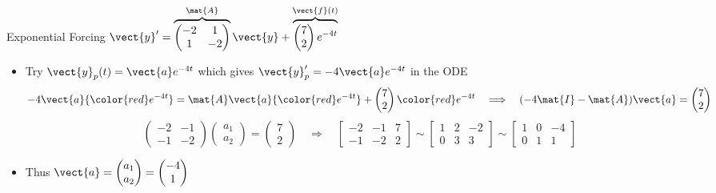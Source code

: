 \begin{frame}{Exponential Forcing \qquad $\vect{y}'=\overbrace{\begin{pmatrix}-2&1\\1&-2\end{pmatrix}}^{\mat{A}}\vect{y}+\overbrace{\begin{pmatrix}7\\2\end{pmatrix}e^{-4t}}^{\vect{f}(t)}$}
\small
\setlength{\abovedisplayskip}{3pt}
\setlength{\belowdisplayskip}{3pt}
\begin{itemize}
\setlength{\itemsep}{3pt}
  \item Try $\vect{y}_p(t)=\vect{a}e^{-4t}$ which gives
  $\vect{y}_p'=-4\vect{a}e^{-4t}$ in the ODE
  \[
    -4\vect{a}{\color{red}e^{-4t}}=\mat{A}\vect{a}{\color{red}e^{-4t}}
    +\begin{pmatrix}7\\2\end{pmatrix}{\color{red}e^{-4t}}
    \quad\Longrightarrow\quad
    (-4\mat{I}-\mat{A})\vect{a}=\begin{pmatrix}7\\2\end{pmatrix}
  \]
  \[
    \left(\begin{array}{rr}-2&-1\\-1&-2\end{array}\right)\begin{pmatrix}a_1\\a_2\end{pmatrix}
    =\begin{pmatrix}7\\2\end{pmatrix}
    \quad\Longrightarrow\quad
    \left[\begin{array}{rr|r}-2&-1&7\\-1&-2&2\end{array}\right]
    \sim\left[\begin{array}{rr|r}1&2&-2\\0&3&3\end{array}\right]
    \sim\left[\begin{array}{rr|r}1&0&-4\\0&1&1\end{array}\right]
  \]
  \item Thus $\vect{a}=\begin{pmatrix}a_1\\a_2\end{pmatrix}=\begin{pmatrix}-4\\1\end{pmatrix}$

\end{itemize}
\end{frame}
